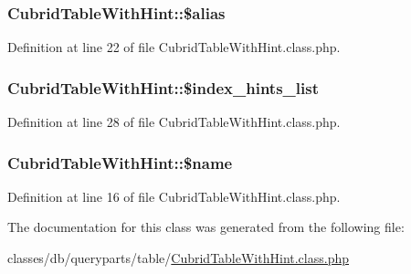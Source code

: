 \subsubsection[{\$alias}]{\setlength{\rightskip}{0pt plus 5cm}Cubrid\+Table\+With\+Hint\+::\$alias}\label{classCubridTableWithHint_a6d3d82772e30eaaeb3f4f2cb5f137934}


Definition at line 22 of file Cubrid\+Table\+With\+Hint.\+class.\+php.

\hypertarget{classCubridTableWithHint_abd22f208291f463ef34e7d5eeb127996}{}
\subsubsection[{\$index\+\_\+hints\+\_\+list}]{\setlength{\rightskip}{0pt plus 5cm}Cubrid\+Table\+With\+Hint\+::\$index\+\_\+hints\+\_\+list}\label{classCubridTableWithHint_abd22f208291f463ef34e7d5eeb127996}


Definition at line 28 of file Cubrid\+Table\+With\+Hint.\+class.\+php.

\hypertarget{classCubridTableWithHint_a29881ddda6971b68daf8719236f3b3f4}{}
\subsubsection[{\$name}]{\setlength{\rightskip}{0pt plus 5cm}Cubrid\+Table\+With\+Hint\+::\$name}\label{classCubridTableWithHint_a29881ddda6971b68daf8719236f3b3f4}


Definition at line 16 of file Cubrid\+Table\+With\+Hint.\+class.\+php.



The documentation for this class was generated from the following file\+:\begin{DoxyCompactItemize}
\item 
classes/db/queryparts/table/\hyperlink{CubridTableWithHint_8class_8php}{Cubrid\+Table\+With\+Hint.\+class.\+php}\end{DoxyCompactItemize}
